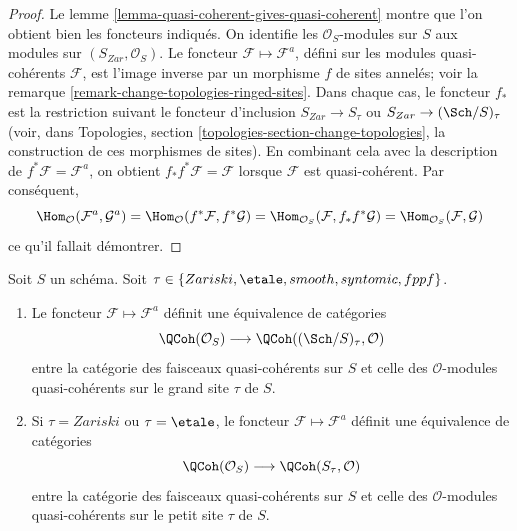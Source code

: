 \begin{proof}
Le lemme \ref{lemma-quasi-coherent-gives-quasi-coherent} montre que l'on
obtient bien les foncteurs indiqués. On identifie les
$\mathcal{O}_S$-modules sur $S$ aux modules sur
$(S_{Zar}, \mathcal{O}_S)$. Le foncteur
$\mathcal{F} \mapsto \mathcal{F}^a$, défini sur les modules
quasi-cohérents $\mathcal{F}$, est l'image inverse par un morphisme $f$
de sites annelés; voir la remarque
\ref{remark-change-topologies-ringed-sites}. Dans chaque cas, le foncteur
$f_*$ est la restriction suivant le foncteur d'inclusion
$S_{Zar} \to S_\tau$ ou $S_{Zar} \to (\Sch/S)_\tau$ (voir, dans
Topologies, section \ref{topologies-section-change-topologies}, la
construction de ces morphismes de sites). En combinant cela avec la
description de $f^*\mathcal{F} = \mathcal{F}^a$, on obtient
$f_*f^*\mathcal{F} = \mathcal{F}$ lorsque $\mathcal{F}$ est
quasi-cohérent. Par conséquent,
$$
\Hom_\mathcal{O}(\mathcal{F}^a, \mathcal{G}^a) =
\Hom_\mathcal{O}(f^*\mathcal{F}, f^*\mathcal{G}) =
\Hom_{\mathcal{O}_S}(\mathcal{F}, f_*f^*\mathcal{G}) =
\Hom_{\mathcal{O}_S}(\mathcal{F}, \mathcal{G})
$$
ce qu'il fallait démontrer.
\end{proof}

\begin{proposition}
\label{proposition-equivalence-quasi-coherent}
Soit $S$ un schéma.
Soit $\tau \in \{Zariski, \linebreak[0] \etale, \linebreak[0]
smooth, \linebreak[0] syntomic, \linebreak[0] fppf\}$.
\begin{enumerate}
\item Le foncteur $\mathcal{F} \mapsto \mathcal{F}^a$ définit une
équivalence de catégories
$$
\QCoh(\mathcal{O}_S)
\longrightarrow
\QCoh((\Sch/S)_\tau, \mathcal{O})
$$
entre la catégorie des faisceaux quasi-cohérents sur $S$ et celle des
$\mathcal{O}$-modules quasi-cohérents sur le grand site $\tau$ de $S$.
\item Si $\tau = Zariski$ ou $\tau = \etale$, le foncteur
$\mathcal{F} \mapsto \mathcal{F}^a$ définit une équivalence de catégories
$$
\QCoh(\mathcal{O}_S)
\longrightarrow
\QCoh(S_\tau, \mathcal{O})
$$
entre la catégorie des faisceaux quasi-cohérents sur $S$ et celle des
$\mathcal{O}$-modules quasi-cohérents sur le petit site $\tau$ de $S$.
\end{enumerate}
\end{proposition}

